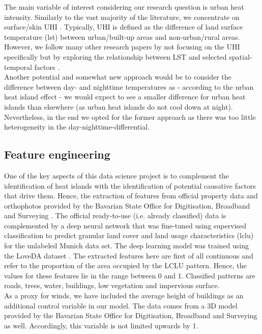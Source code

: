 \documentclass[12pt]{article}
\begin{document}
The main variable of interest considering our research question is urban heat intensity. Similarly to the vast majority of the literature, we concentrate on surface/skin UHI \citep{deilami2018}. Typically, UHI is defined as the difference of land surface temperature (\acrshort{lst}) between urban/built-up areas and non-urban/rural areas. However, we follow many other research papers by not focusing on the UHI specifically but by exploring the relationship between LST and selected spatial-temporal factors \citep{deilami2018}.\\
Another potential and somewhat new approach would be to consider the difference between day- and nighttime temperatures as - according to the urban heat island effect - we would expect to see a smaller difference for urban heat islands than elsewhere (as urban heat islands do not cool down at night). Nevertheless, in the end we opted for the former approach as there was too little heterogeneity in the day-nighttime-differential.

\subsection{Feature engineering}

One of the key aspects of this data science project is to complement the identification of heat islands with the identification of potential causative factors that drive them. Hence, the extraction of features from official property data and orthophotos provided by the Bavarian State Office for Digitisation, Broadband and Surveying \citep{bayern2018}. The official ready-to-use (i.e. already classified) data is complemented by a deep neural network that was fine-tuned using supervised classification to predict granular land cover and land usage characteristics (\acrshort{lclu}) for the unlabeled Munich data set. The deep learning model was trained using the LoveDA dataset \citep{loveda2021}. The extracted features here are first of all continuous and refer to the proportion of the area occupied by the LCLU pattern. Hence, the values for these features lie in the range between 0 and 1. Classified patterns are roads, trees, water, buildings, low vegetation and impervious surface.\\
As a proxy for winds, we have included the average height of buildings as an additional control variable in our model. The data comes from a 3D model provided by the Bavarian State Office for Digitisation, Broadband and Surveying \citep{bayern2018} as well. Accordingly, this variable is not limited upwards by 1.
\end{document}
